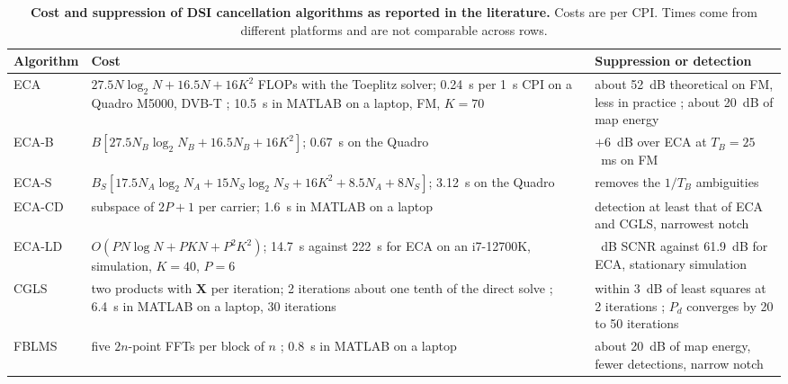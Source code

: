 \begin{table}[H]
    \centering
    \caption[Cost and suppression of DSI cancellation algorithms]{\textbf{Cost and suppression of DSI cancellation algorithms as reported in the literature.} Costs are per CPI. Times come from different platforms and are not comparable across rows.}
    \begin{tabularx}{\textwidth}{l>{\raggedright\arraybackslash}X>{\raggedright\arraybackslash}X}
    \toprule
    \textbf{Algorithm} & \textbf{Cost} & \textbf{Suppression or detection} \\
    \midrule
    ECA & $27.5N\log_2 N + 16.5N + 16K^2$ FLOPs with the Toeplitz solver; 0.24~s per 1~s CPI on a Quadro M5000, DVB-T \citep{colone2016}; 10.5~s in MATLAB on a laptop, FM, $K = 70$ \citep{schuepbach2020} & about 52~dB theoretical on FM, less in practice \citep{colone2016}; about 20~dB of map energy \citep{schuepbach2020} \\
    ECA-B & $B[27.5N_B\log_2 N_B + 16.5N_B + 16K^2]$; 0.67~s on the Quadro \citep{colone2016} & $+6$~dB over ECA at $T_B = 25$~ms on FM \citep{colone2016} \\
    ECA-S & $B_S[17.5N_A\log_2 N_A + 15N_S\log_2 N_S + 16K^2 + 8.5N_A + 8N_S]$; 3.12~s on the Quadro \citep{colone2016} & removes the $1/T_B$ ambiguities \citep{colone2016} \\
    ECA-CD & subspace of $2P+1$ per carrier; 1.6~s in MATLAB on a laptop \citep{schuepbach2020} & detection at least that of ECA and CGLS, narrowest notch \citep{schuepbach2020} \\
    ECA-LD & $O(PN\log N + PKN + P^2K^2)$; 14.7~s against 222~s for ECA on an i7-12700K, simulation, $K = 40$, $P = 6$ \citep{lu2026} & 52.8~dB SCNR against 61.9~dB for ECA, stationary simulation \citep{lu2026} \\
    CGLS & two products with $\mathbf{X}$ per iteration; 2 iterations about one tenth of the direct solve \citep{tong2014}; 6.4~s in MATLAB on a laptop, 30 iterations \citep{schuepbach2020} & within 3~dB of least squares at 2 iterations \citep{tong2014}; $P_d$ converges by 20 to 50 iterations \citep{paine2019a} \\
    FBLMS & five $2n$-point FFTs per block of $n$ \citep{ferrara1980}; 0.8~s in MATLAB on a laptop \citep{schuepbach2020} & about 20~dB of map energy, fewer detections, narrow notch \citep{schuepbach2020} \\
    \bottomrule
    \end{tabularx}
    \label{table:ch2.dsi-comparison}
\end{table}

